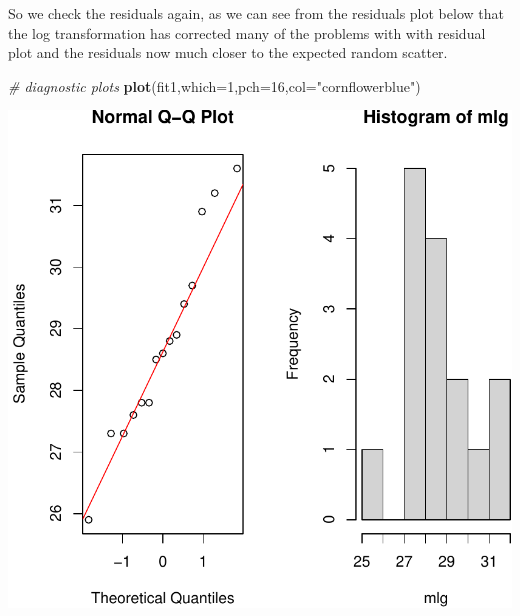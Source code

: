 \documentclass[
]{article}
\newenvironment{Shaded}{\begin{snugshade}}{\end{snugshade}}
\newcommand{\AttributeTok}[1]{\textcolor[rgb]{0.13,0.29,0.53}{#1}}
\newcommand{\CommentTok}[1]{\textcolor[rgb]{0.56,0.35,0.01}{\textit{#1}}}
\newcommand{\DecValTok}[1]{\textcolor[rgb]{0.00,0.00,0.81}{#1}}
\newcommand{\FunctionTok}[1]{\textcolor[rgb]{0.13,0.29,0.53}{\textbf{#1}}}
\newcommand{\NormalTok}[1]{#1}
\newcommand{\SpecialCharTok}[1]{\textcolor[rgb]{0.81,0.36,0.00}{\textbf{#1}}}
\newcommand{\StringTok}[1]{\textcolor[rgb]{0.31,0.60,0.02}{#1}}
\begin{document}
\begin{Shaded}
\end{Shaded}


So we check the residuals again, as we can see from the residuals plot
below that the log transformation has corrected many of the problems
with with residual plot and the residuals now much closer to the
expected random scatter.

\begin{Shaded}
\begin{Highlighting}[]
\CommentTok{\# diagnostic plots }
\FunctionTok{plot}\NormalTok{(fit1,}\AttributeTok{which=}\DecValTok{1}\NormalTok{,}\AttributeTok{pch=}\DecValTok{16}\NormalTok{,}\AttributeTok{col=}\StringTok{"cornflowerblue"}\NormalTok{)}
\end{Highlighting}
\end{Shaded}

\begin{center}\includegraphics[width=0.6\linewidth,height=0.6\textheight]{unnamed-chunk-62-1} \end{center}
\end{document}
